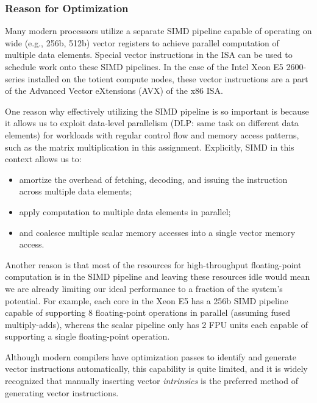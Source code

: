 
\subsubsection{Reason for Optimization}

Many modern processors utilize a separate SIMD pipeline capable of
operating on wide (e.g., 256b, 512b) vector registers to achieve parallel
computation of multiple data elements. Special vector instructions in the
ISA can be used to schedule work onto these SIMD pipelines. In the case
of the Intel Xeon E5 2600-series installed on the totient compute nodes,
these vector instructions are a part of the Advanced Vector eXtensions
(AVX) of the x86 ISA.
\smallskip

One reason why effectively utilizing the SIMD pipeline is so important is
because it allows us to exploit data-level parallelism (DLP: same task on
different data elements) for workloads with regular control flow and
memory access patterns, such as the matrix multiplication in this
assignment. Explicitly, SIMD in this context allows us to:

\begin{itemize}
  \item amortize the overhead of fetching, decoding, and issuing the
    instruction across multiple data elements;
  \item apply computation to multiple data elements in parallel;
  \item and coalesce multiple scalar memory accesses into a single vector
    memory access.
\end{itemize}
\smallskip

Another reason is that most of the resources for high-throughput
floating-point computation is in the SIMD pipeline and leaving these
resources idle would mean we are already limiting our ideal performance
to a fraction of the system's potential. For example, each core in the
Xeon E5 has a 256b SIMD pipeline capable of supporting 8 floating-point
operations in parallel (assuming fused multiply-adds), whereas the scalar
pipeline only has 2 FPU units each capable of supporting a single
floating-point operation.
\smallskip

Although modern compilers have optimization passes to identify and
generate vector instructions automatically, this capability is quite
limited, and it is widely recognized that manually inserting vector
\emph{intrinsics} is the preferred method of generating vector
instructions.
\medskip

